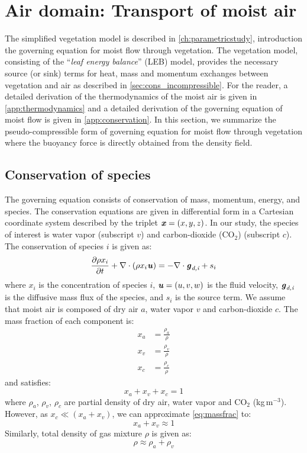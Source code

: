 \section{Air domain: Transport of moist air}
\label{sec:airdomain}
The simplified vegetation model is described in \cref{ch:parametricstudy}, introduction the governing equation for moist flow through vegetation. The vegetation model, consisting of the ``\textit{leaf energy balance}'' (LEB) model, provides the necessary source (or sink) terms for heat, mass and momentum exchanges between vegetation and air as described in \cref{sec:cons_incompressible}. For the reader, a detailed derivation of the thermodynamics of the moist air is given in \cref{app:thermodynamics} and a detailed derivation of the governing equation of moist flow is given in \cref{app:conservation}. In this section, we summarize the pseudo-compressible form of governing equation for moist flow through vegetation where the buoyancy force is directly obtained from the density field.  


\subsection*{Conservation of species}
The governing equation consists of conservation of mass, momentum, energy, and species. The conservation equations are given in differential form in a Cartesian coordinate system described by the triplet $\textbf{\textit{x}} = (x,y,z)$. In our study, the species of interest is water vapor (subscript $v$) and carbon-dioxide (CO$_2$) (subscript $c$). The conservation of species $i$ is given as:
\begin{equation}
\frac{\partial \rho x_i}{\partial t} + \nabla  \cdot \left( \rho x_i \textbf{\textit{u}} \right) = - \nabla \cdot \textbf{\textit{g}}_{\textit{d,i}} + s_i
\label{eq:xi}
\end{equation}
where $x_i$ is the concentration of species $i$, $\textbf{\textit{u}} = \left(u,v,w\right)$ is the fluid velocity, $\textbf{\textit{g}}_{\textit{d,i}}$ is the diffusive mass flux of the species, and $s_i$ is the source term. We assume that moist air is composed of dry air $a$, water vapor $v$ and carbon-dioxide $c$. The mass fraction of each component is:
\begin{align}
x_a &= \frac{\rho_a}{\rho} \\
x_v &= \frac{\rho_v}{\rho} \label{eq:xv}\\
x_c &= \frac{\rho_c}{\rho}\label{eq:xc}
\end{align}
and satisfies:
\begin{equation}
x_a + x_v + x_c = 1
\label{eq:massfrac}
\end{equation}
where $\rho_a$, $\rho_v$, $\rho_c$ are partial density of dry air, water vapor and CO$_2$ (kg\,m$^{-3}$). However, as $x_c \ll (x_a+x_v)$, we can approximate \cref{eq:massfrac} to:
\begin{equation}
x_a + x_v \approx 1
\end{equation}
Similarly, total density of gas mixture $\rho$ is given as:
\begin{equation}
\rho \approx \rho_a + \rho_v
\label{eq:rho2}
\end{equation} 

